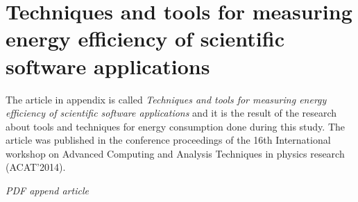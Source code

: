 \chapter{Techniques and tools for measuring energy efficiency of scientific software applications}
\label{chapter:first-appendix}

The article in appendix is called \textit{Techniques and tools for measuring energy efficiency of scientific software applications} and it is the result of the research about tools and techniques for energy consumption done during this study. The article was published in the conference proceedings of the 16th International workshop on Advanced Computing and Analysis Techniques in physics research (ACAT'2014). 


\textit{PDF append article}


